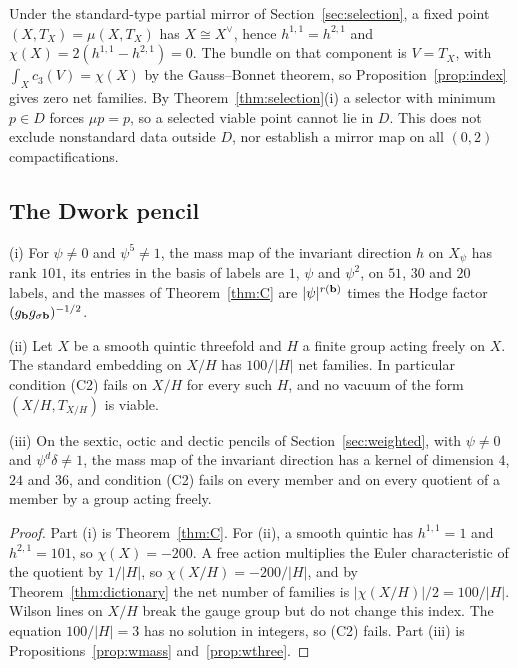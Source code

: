 Under the standard-type partial mirror of Section~\ref{sec:selection}, a
fixed point $(X,T_X)=\mu(X,T_X)$ has $X\cong X^\vee$, hence
$h^{1,1}=h^{2,1}$ and $\chi(X)=2(h^{1,1}-h^{2,1})=0$. The bundle on that
component is $V=T_X$, with $\int_Xc_3(V)=\chi(X)$ by the Gauss--Bonnet
theorem, so Proposition~\ref{prop:index} gives zero net families. By
Theorem~\ref{thm:selection}(i) a selector with minimum $p\in D$ forces
$\mu p=p$, so a selected viable point cannot lie in $D$. This does not
exclude nonstandard data outside $D$, nor establish a mirror map on all
$(0,2)$ compactifications.



\subsection{The Dwork pencil}

\begin{proposition}\label{prop:dworkselect}
\textup{(i)} For $\psi\ne0$ and $\psi^5\ne1$, the mass map of the invariant
direction $h$ on $X_\psi$ has rank $101$, its entries in the basis of
labels are $1$, $\psi$ and $\psi^2$, on $51$, $30$ and $20$ labels, and the
masses of Theorem~\ref{thm:C} are $|\psi|^{r(\mathbf{b})}$ times the Hodge factor
$(g_{\mathbf{b}}g_{\sigma\mathbf{b}})^{-1/2}$.

\textup{(ii)} Let $X$ be a smooth quintic threefold and $H$ a finite group
acting freely on $X$. The standard embedding on $X/H$ has
$100/|H|$ net families. In particular condition \textup{(C2)} fails on
$X/H$ for every such $H$, and no vacuum of the form $(X/H,T_{X/H})$ is
viable.

\textup{(iii)} On the sextic, octic and dectic pencils of
Section~\ref{sec:weighted}, with $\psi\ne0$ and $\psi^d\delta\ne1$, the
mass map of the invariant direction has a kernel of dimension $4$, $24$ and
$36$, and condition \textup{(C2)} fails on every member and on every
quotient of a member by a group acting freely.
\end{proposition}

\begin{proof}
Part (i) is Theorem~\ref{thm:C}. For (ii), a smooth quintic has
$h^{1,1}=1$ and $h^{2,1}=101$, so $\chi(X)=-200$. A free action multiplies
the Euler characteristic of the quotient by $1/|H|$, so
$\chi(X/H)=-200/|H|$, and by Theorem~\ref{thm:dictionary} the net number of
families is $|\chi(X/H)|/2=100/|H|$. Wilson lines on $X/H$ break the gauge
group but do not change this index. The equation $100/|H|=3$ has no
solution in integers, so (C2) fails. Part (iii) is
Propositions~\ref{prop:wmass} and~\ref{prop:wthree}.
\end{proof}

